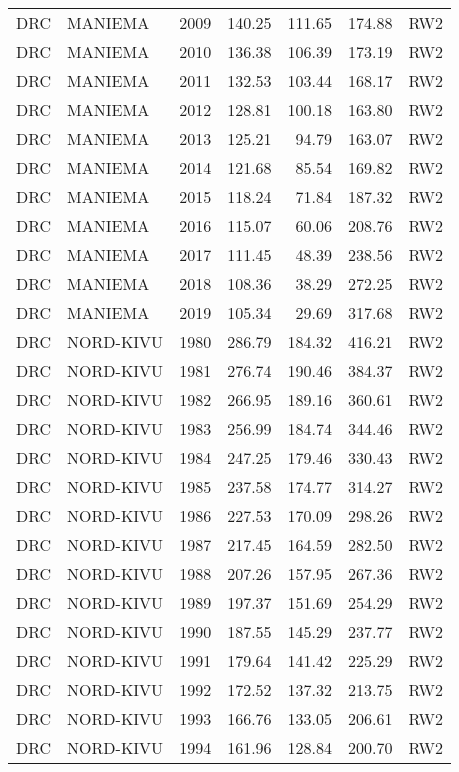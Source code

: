 \begin{longtable}{lllrrrl}
  DRC & MANIEMA & 2009 & 140.25 & 111.65 & 174.88 & RW2 \\ 
  DRC & MANIEMA & 2010 & 136.38 & 106.39 & 173.19 & RW2 \\ 
  DRC & MANIEMA & 2011 & 132.53 & 103.44 & 168.17 & RW2 \\ 
  DRC & MANIEMA & 2012 & 128.81 & 100.18 & 163.80 & RW2 \\ 
  DRC & MANIEMA & 2013 & 125.21 & 94.79 & 163.07 & RW2 \\ 
  DRC & MANIEMA & 2014 & 121.68 & 85.54 & 169.82 & RW2 \\ 
  DRC & MANIEMA & 2015 & 118.24 & 71.84 & 187.32 & RW2 \\ 
  DRC & MANIEMA & 2016 & 115.07 & 60.06 & 208.76 & RW2 \\ 
  DRC & MANIEMA & 2017 & 111.45 & 48.39 & 238.56 & RW2 \\ 
  DRC & MANIEMA & 2018 & 108.36 & 38.29 & 272.25 & RW2 \\ 
  DRC & MANIEMA & 2019 & 105.34 & 29.69 & 317.68 & RW2 \\ 
  DRC & NORD-KIVU & 1980 & 286.79 & 184.32 & 416.21 & RW2 \\ 
  DRC & NORD-KIVU & 1981 & 276.74 & 190.46 & 384.37 & RW2 \\ 
  DRC & NORD-KIVU & 1982 & 266.95 & 189.16 & 360.61 & RW2 \\ 
  DRC & NORD-KIVU & 1983 & 256.99 & 184.74 & 344.46 & RW2 \\ 
  DRC & NORD-KIVU & 1984 & 247.25 & 179.46 & 330.43 & RW2 \\ 
  DRC & NORD-KIVU & 1985 & 237.58 & 174.77 & 314.27 & RW2 \\ 
  DRC & NORD-KIVU & 1986 & 227.53 & 170.09 & 298.26 & RW2 \\ 
  DRC & NORD-KIVU & 1987 & 217.45 & 164.59 & 282.50 & RW2 \\ 
  DRC & NORD-KIVU & 1988 & 207.26 & 157.95 & 267.36 & RW2 \\ 
  DRC & NORD-KIVU & 1989 & 197.37 & 151.69 & 254.29 & RW2 \\ 
  DRC & NORD-KIVU & 1990 & 187.55 & 145.29 & 237.77 & RW2 \\ 
  DRC & NORD-KIVU & 1991 & 179.64 & 141.42 & 225.29 & RW2 \\ 
  DRC & NORD-KIVU & 1992 & 172.52 & 137.32 & 213.75 & RW2 \\ 
  DRC & NORD-KIVU & 1993 & 166.76 & 133.05 & 206.61 & RW2 \\ 
  DRC & NORD-KIVU & 1994 & 161.96 & 128.84 & 200.70 & RW2 \\ 

\end{longtable}
